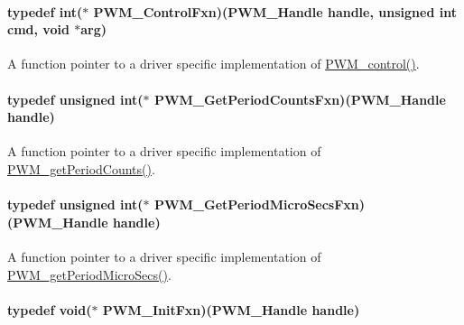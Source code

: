 \paragraph[{P\-W\-M\-\_\-\-Control\-Fxn}]{\setlength{\rightskip}{0pt plus 5cm}typedef int($\ast$ P\-W\-M\-\_\-\-Control\-Fxn)({\bf P\-W\-M\-\_\-\-Handle} handle, unsigned int cmd, void $\ast$arg)}\label{_p_w_m_8h_a6dde480b468175d730b22d7081f4678a}


A function pointer to a driver specific implementation of \hyperlink{_p_w_m_8h_ade999f5b12997479efa1ac85aaf46ef5}{P\-W\-M\-\_\-control()}. 

\paragraph[{P\-W\-M\-\_\-\-Get\-Period\-Counts\-Fxn}]{\setlength{\rightskip}{0pt plus 5cm}typedef unsigned int($\ast$ P\-W\-M\-\_\-\-Get\-Period\-Counts\-Fxn)({\bf P\-W\-M\-\_\-\-Handle} handle)}\label{_p_w_m_8h_add39d810106afecc9c4f311baf940244}


A function pointer to a driver specific implementation of \hyperlink{_p_w_m_8h_af7c6d8e045f6f5cc8b978d68bead5b41}{P\-W\-M\-\_\-get\-Period\-Counts()}. 

\paragraph[{P\-W\-M\-\_\-\-Get\-Period\-Micro\-Secs\-Fxn}]{\setlength{\rightskip}{0pt plus 5cm}typedef unsigned int($\ast$ P\-W\-M\-\_\-\-Get\-Period\-Micro\-Secs\-Fxn)({\bf P\-W\-M\-\_\-\-Handle} handle)}\label{_p_w_m_8h_a001a5aac3f5df42fbcc00ecea8d9e7cb}


A function pointer to a driver specific implementation of \hyperlink{_p_w_m_8h_a150ccda2b9cb65f8c12d173bba10df53}{P\-W\-M\-\_\-get\-Period\-Micro\-Secs()}. 

\paragraph[{P\-W\-M\-\_\-\-Init\-Fxn}]{\setlength{\rightskip}{0pt plus 5cm}typedef void($\ast$ P\-W\-M\-\_\-\-Init\-Fxn)({\bf P\-W\-M\-\_\-\-Handle} handle)}\label{_p_w_m_8h_a427ec22f2d4e0ed90d90a5ee2fb0642f}


